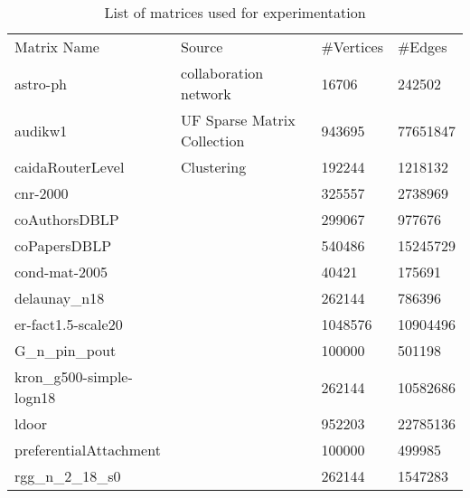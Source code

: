 \begin{table*}[]
\centering
\caption{List of matrices used for experimentation}
\label{tab:matrix}
\begin{tabular}{llll}
Matrix Name              & Source                      & \#Vertices & \#Edges  \\
astro-ph                 & collaboration network       & 16706      & 242502   \\
audikw1                  & UF Sparse Matrix Collection & 943695     & 77651847 \\
caidaRouterLevel         & Clustering                  & 192244     & 1218132  \\
cnr-2000                 &                             & 325557     & 2738969  \\
coAuthorsDBLP            &                             & 299067     & 977676   \\
coPapersDBLP             &                             & 540486     & 15245729 \\
cond-mat-2005            &                             & 40421      & 175691   \\
delaunay\_n18            &                             & 262144     & 786396   \\
er-fact1.5-scale20       &                             & 1048576    & 10904496 \\
G\_n\_pin\_pout          &                             & 100000     & 501198   \\
kron\_g500-simple-logn18 &                             & 262144     & 10582686 \\
ldoor                    &                             & 952203     & 22785136 \\
preferentialAttachment   &                             & 100000     & 499985   \\
rgg\_n\_2\_18\_s0        &                             & 262144     & 1547283 
\end{tabular}
\end{table*}